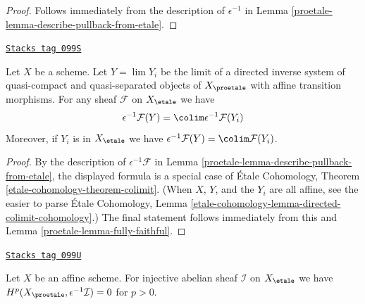 \begin{proof}

Follows immediately from the description of
$\epsilon^{-1}$ in Lemma \ref{proetale-lemma-describe-pullback-from-etale}.
\end{proof}

\begin{lemma}
\label{proetale-lemma-limit-pullback}
\href{https://stacks.math.columbia.edu/tag/099S}{\texttt{Stacks tag 099S}}

Let $X$ be a scheme. Let $Y = \lim Y_i$ be the limit of a directed inverse
system of quasi-compact and quasi-separated objects of $X_\proetale$
with affine transition morphisms. For any sheaf $\mathcal{F}$ on $X_\etale$
we have
$$
\epsilon^{-1}\mathcal{F}(Y) = \colim \epsilon^{-1}\mathcal{F}(Y_i)
$$
Moreover, if $Y_i$ is in $X_\etale$ we have
$\epsilon^{-1}\mathcal{F}(Y) = \colim \mathcal{F}(Y_i)$.
\end{lemma}

\begin{proof}

By the description of $\epsilon^{-1}\mathcal{F}$ in
Lemma \ref{proetale-lemma-describe-pullback-from-etale}, the displayed formula
is a special case of \'Etale Cohomology, Theorem
\ref{etale-cohomology-theorem-colimit}.
(When $X$, $Y$, and the $Y_i$ are all affine, see
the easier to parse \'Etale Cohomology, Lemma
\ref{etale-cohomology-lemma-directed-colimit-cohomology}.)
The final statement follows immediately from this
and Lemma \ref{proetale-lemma-fully-faithful}.
\end{proof}

\begin{lemma}
\label{proetale-lemma-affine-vanishing}
\href{https://stacks.math.columbia.edu/tag/099U}{\texttt{Stacks tag 099U}}

Let $X$ be an affine scheme. For injective abelian sheaf $\mathcal{I}$ on
$X_\etale$ we have $H^p(X_\proetale, \epsilon^{-1}\mathcal{I}) = 0$
for $p > 0$.
\end{lemma}

